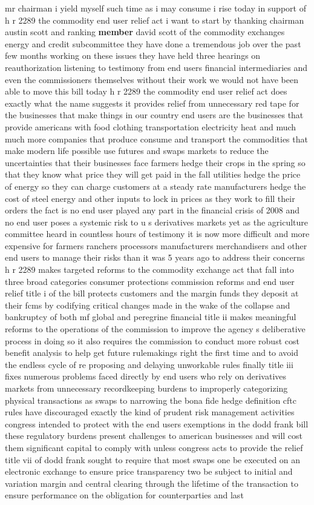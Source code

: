 \documentclass{article}
\begin{document}
mr chairman i yield myself such time as i may consume i rise today in support of h r 2289 the commodity end user relief act i want to start by thanking chairman austin scott and ranking {\bf \color{red} member} david scott of the commodity exchanges energy and credit subcommittee they have done a tremendous job over the past few months working on these issues they have held three hearings on reauthorization listening to testimony from end users financial intermediaries and even the commissioners themselves without their work we would not have been able to move this bill today h r 2289 the commodity end user relief act does exactly what the name suggests it provides relief from unnecessary red tape for the businesses that make things in our country end users are the businesses that provide americans with food clothing transportation electricity heat and much much more companies that produce consume and transport the commodities that make modern life possible use futures and swaps markets to reduce the uncertainties that their businesses face farmers hedge their crops in the spring so that they know what price they will get paid in the fall utilities hedge the price of energy so they can charge customers at a steady rate manufacturers hedge the cost of steel energy and other inputs to lock in prices as they work to fill their orders the fact is no end user played any part in the financial crisis of 2008 and no end user poses a systemic risk to u s derivatives markets yet as the agriculture committee heard in countless hours of testimony it is now more difficult and more expensive for farmers ranchers processors manufacturers merchandisers and other end users to manage their risks than it was 5 years ago to address their concerns h r 2289 makes targeted reforms to the commodity exchange act that fall into three broad categories consumer protections commission reforms and end user relief title i of the bill protects customers and the margin funds they deposit at their fcms by codifying critical changes made in the wake of the collapse and bankruptcy of both mf global and peregrine financial title ii makes meaningful reforms to the operations of the commission to improve the agency s deliberative process in doing so it also requires the commission to conduct more robust cost benefit analysis to help get future rulemakings right the first time and to avoid the endless cycle of re proposing and delaying unworkable rules finally title iii fixes numerous problems faced directly by end users who rely on derivatives markets from unnecessary recordkeeping burdens to improperly categorizing physical transactions as swaps to narrowing the bona fide hedge definition cftc rules have discouraged exactly the kind of prudent risk management activities congress intended to protect with the end users exemptions in the dodd frank bill these regulatory burdens present challenges to american businesses and will cost them significant capital to comply with unless congress acts to provide the relief title vii of dodd frank sought to require that most swaps one be executed on an electronic exchange to ensure price transparency two be subject to initial and variation margin and central clearing through the lifetime of the transaction to ensure performance on the obligation for counterparties and last 
\end{document}
